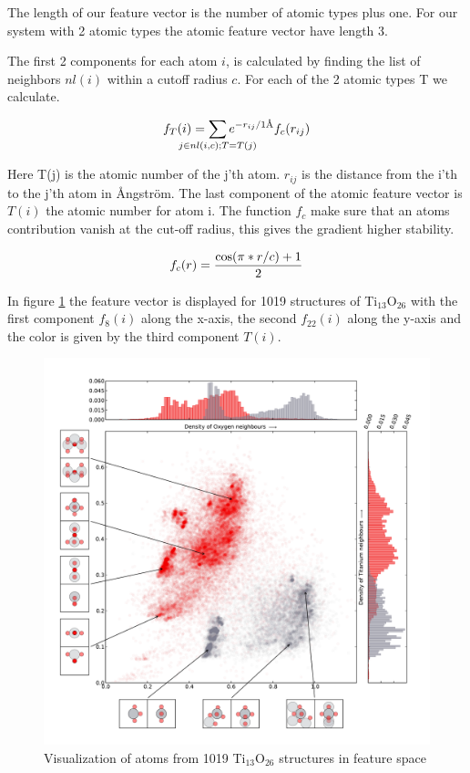 \documentclass[%
 aps,
 prl,%
 amsmath,amssymb,
 reprint,%
]{revtex4-1}
\begin{document}
The length of our feature vector is the number of atomic types plus one. For our system with 2 atomic types the atomic feature vector have length 3.

The first 2 components for each atom $i$, is calculated by finding the list of neighbors $nl(i)$ within a cutoff radius $c$. For each of the 2 atomic types T we calculate. 

\begin{equation}
f_T(i) = \sum_{\mathclap{j \in nl(i,c);T=T(j)}} e^{-r_{ij}/1\text{\AA}}f_c(r_{ij})  \label{eq1}
\end{equation}

Here T(j) is the atomic number of the j'th atom. $r_{ij}$ is the distance from the i'th to the j'th atom in {\AA}ngstr\"{o}m. The last component of the atomic feature vector is $T(i)$ the atomic number for atom i. 
The function $f_c$ make sure that an atoms contribution vanish at the cut-off radius, this gives the gradient higher stability.

\begin{equation}
f_c(r)={{\cos(\pi*r/c)+1}\over 2}
\end{equation}



In figure \ref{fig1} the feature vector is displayed for 1019 structures of Ti$_{13}$O$_{26}$ with the first component $f_8(i)$ along the x-axis, the second $f_{22}(i)$ along the y-axis and the color is given by the third component $T(i)$. 


\begin{figure}[h]
    \centering
    \includegraphics[width=1.0\columnwidth]{fig1-scatterplot.pdf}
    \caption{Visualization of atoms from 1019 Ti$_{13}$O$_{26}$ structures in feature space}
    \label{fig1}
\end{figure}
\end{document}
